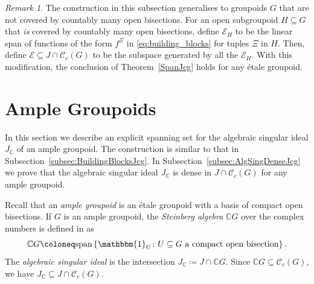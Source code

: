 \documentclass[11pt, oneside, reqno]{amsart}
\newcommand{\cg}{\mathscr{C}_c(G)}
\newcommand{\PRLsep}{\noindent\makebox[\linewidth]{\resizebox{0.3333\linewidth}{1pt}{$\bullet$}}\bigskip}
\theoremstyle{definition}
\theoremstyle{remark}
\newtheorem{rmk}[thm]{Remark}
\numberwithin{equation}{section}
\begin{document}
\begin{rmk}\label{rmk:UncountablyBisections}
    The construction in this subsection generalises to groupoids $G$ that are not covered by countably many open bisections. For an open subgroupoid $H \subseteq G$ that \emph{is} covered by countably many open bisections, define $\mathcal{E}_H$ to be the linear span of functions of the form $f^\Xi$ in \eqref{eq:building_blocks} for tuples $\Xi$ in $H$. Then, define $\mathcal{E} \subseteq J \cap \cg$ to be the subspace generated by all the $\mathcal{E}_H$. %
    With this modification, the conclusion of Theorem~\ref{SpanJcg} holds for any \'etale groupoid.
\end{rmk}

\section{Ample Groupoids}
\label{sec:Ample}

In this section we describe an explicit spanning set for the algebraic singular ideal $J_\mathbb{C}$ of an ample groupoid. The construction is similar to that in Subsection~\ref{subsec:BuildingBlocksJcg}. In Subsection~\ref{subsec:AlgSingDenseJcg} we prove that the algebraic singular ideal $J_\mathbb{C}$ is dense in $J \cap \cg$ for any ample groupoid.

\vspace{0.3cm}
Recall that an \emph{ample groupoid} is an \'etale groupoid with a basis of compact open bisections. If $G$ is an ample groupoid, the \emph{Steinberg algebra} $\mathbb{C}G$ over the complex numbers is defined in \cite{S10} as
\[
\mathbb{C}G \coloneq \text{span}\left\{ \mathbbm{1}_U \colon U \subseteq G \text{ a compact open bisection}\right\}.
\]
The \emph{algebraic singular ideal} is the intersection $J_{\mathbb{C}} \coloneq J \cap \mathbb{C}G$. Since $\mathbb{C}G \subseteq \cg$, we have $J_\mathbb{C} \subseteq J \cap \cg$.

\PRLsep
\end{document}
